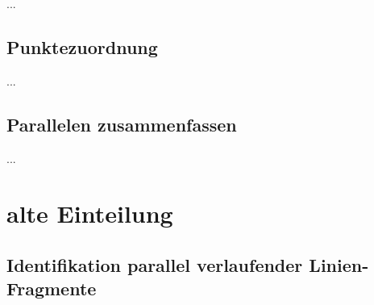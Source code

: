 \documentclass[../main/thesis.tex]{subfiles}
\begin{document}
...


\subsection{Punktezuordnung}

%
%

...


\subsection{Parallelen zusammenfassen}

%

...




\section{alte Einteilung}

\subsection{Identifikation parallel verlaufender Linien-Fragmente}
\end{document}
